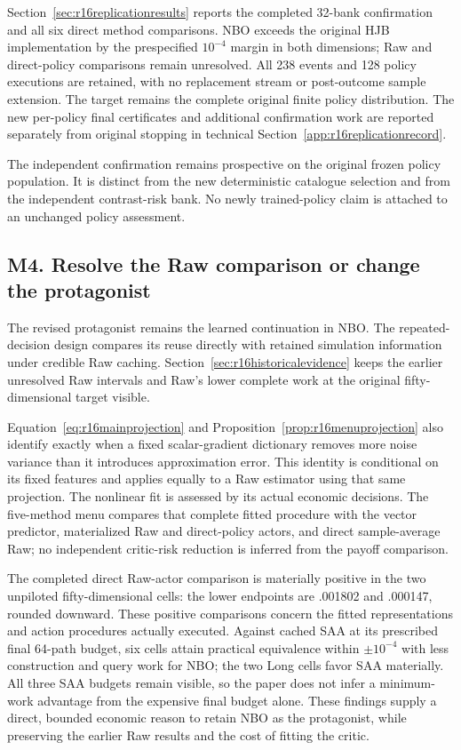 Section~\ref{sec:r16replicationresults} reports the completed 32-bank confirmation and all six direct method comparisons. NBO exceeds the original HJB implementation by the prespecified $10^{-4}$ margin in both dimensions; Raw and direct-policy comparisons remain unresolved. All 238 events and 128 policy executions are retained, with no replacement stream or post-outcome sample extension. The target remains the complete original finite policy distribution. The new per-policy final certificates and additional confirmation work are reported separately from original stopping in technical Section~\ref{app:r16replicationrecord}.


The independent confirmation remains prospective on the original frozen policy population. It is distinct from the new deterministic catalogue selection and from the independent contrast-risk bank. No newly trained-policy claim is attached to an unchanged policy assessment.

\subsection*{M4. Resolve the Raw comparison or change the protagonist}\label{resp:M4}
The revised protagonist remains the learned continuation in NBO. The repeated-decision design compares its reuse directly with retained simulation information under credible Raw caching. Section~\ref{sec:r16historicalevidence} keeps the earlier unresolved Raw intervals and Raw's lower complete work at the original fifty-dimensional target visible.

Equation~\eqref{eq:r16mainprojection} and Proposition~\ref{prop:r16menuprojection} also identify exactly when a fixed scalar-gradient dictionary removes more noise variance than it introduces approximation error. This identity is conditional on its fixed features and applies equally to a Raw estimator using that same projection. The nonlinear fit is assessed by its actual economic decisions. The five-method menu compares that complete fitted procedure with the vector predictor, materialized Raw and direct-policy actors, and direct sample-average Raw; no independent critic-risk reduction is inferred from the payoff comparison.

The completed direct Raw-actor comparison is materially positive in the two unpiloted fifty-dimensional cells: the lower endpoints are .001802 and .000147, rounded downward. These positive comparisons concern the fitted representations and action procedures actually executed. Against cached SAA at its prescribed final 64-path budget, six cells attain practical equivalence within $\pm10^{-4}$ with less construction and query work for NBO; the two Long cells favor SAA materially. All three SAA budgets remain visible, so the paper does not infer a minimum-work advantage from the expensive final budget alone. These findings supply a direct, bounded economic reason to retain NBO as the protagonist, while preserving the earlier Raw results and the cost of fitting the critic.


